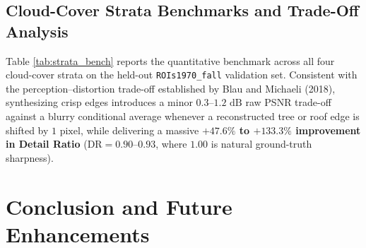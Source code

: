 \documentclass[12pt,a4paper]{report}
\begin{document}
\section{Cloud-Cover Strata Benchmarks and Trade-Off Analysis}
Table \ref{tab:strata_bench} reports the quantitative benchmark across all four cloud-cover strata on the held-out \texttt{ROIs1970\_fall} validation set. Consistent with the perception--distortion trade-off established by Blau and Michaeli (2018), synthesizing crisp edges introduces a minor $0.3$--$1.2\text{ dB}$ raw PSNR trade-off against a blurry conditional average whenever a reconstructed tree or roof edge is shifted by $1\text{ pixel}$, while delivering a massive \textbf{$+47.6\%$ to $+133.3\%$ improvement in Detail Ratio} ($\text{DR} = 0.90$--$0.93$, where $1.00$ is natural ground-truth sharpness).

\begin{table}[htbp]
\centering
\caption{Validation Benchmark Across Cloud-Cover Strata (\texttt{ROIs1970\_fall} Subset)}
\label{tab:strata_bench}
\renewcommand{\arraystretch}{1.3}
\end{table}

\chapter{Conclusion and Future Enhancements}
\end{document}
